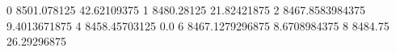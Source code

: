 0 8501.078125 42.62109375
1 8480.28125 21.82421875
2 8467.8583984375 9.4013671875
4 8458.45703125 0.0
6 8467.1279296875 8.6708984375
8 8484.75 26.29296875
